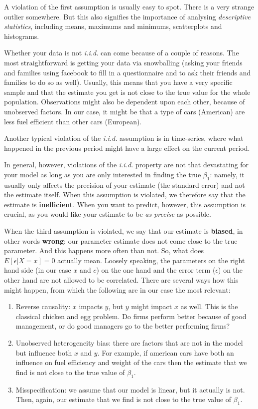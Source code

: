 \documentclass[]{article}
\theoremstyle{definition}
\theoremstyle{definition}
\theoremstyle{definition}
\theoremstyle{remark}
\begin{document}
A violation of the first assumption is usually easy to spot. There is a
very strange outlier somewhere. But this also signifies the importance
of analysing \emph{descriptive statistics}, including means, maximums
and minimums, scatterplots and histograms.

Whether your data is not \emph{i.i.d.} can come because of a couple of
reasons. The most straightforward is getting your data via snowballing
(asking your friends and families using facebook to fill in a
questionnaire and to ask their friends and families to do so as well).
Usually, this means that you have a very specific sample and that the
estimate you get is not close to the true value for the whole
population. Observations might also be dependent upon each other,
because of unobserved factors. In our case, it might be that a type of
cars (American) are less fuel efficient than other cars (European).

Another typical violation of the \emph{i.i.d.} assumption is in
time-series, where what happened in the previous period might have a
large effect on the current period.

In general, however, violations of the \emph{i.i.d.} property are not
that devastating for your model as long as you are only interested in
finding the true \(\beta_1\): namely, it usually only affects the
precision of your estimate (the standard error) and not the estimate
itself. When this assumption is violated, we therefore say that the
estimate is \textbf{inefficient}. When you want to predict, however,
this assumption is crucial, as you would like your estimate to be
\emph{as precise} as possible.

When the third assumption is violated, we say that our estimate is
\textbf{biased}, in other words \textbf{wrong}: our parameter estimate
does not come close to the true parameter. And this happens more often
than not. So, what does \(E[\epsilon|X=x] = 0\) actually mean. Loosely
speaking, the parameters on the right hand side (in our case \(x\) and
\(c\)) on the one hand and the error term (\(\epsilon\)) on the other
hand are not allowed to be correlated. There are several ways how this
might happen, from which the following are in our case the most
relevant:

\begin{enumerate}
\def\labelenumi{\arabic{enumi})}
\item
  Reverse causality: \(x\) impacts \(y\), but \(y\) might impact \(x\)
  as well. This is the classical chicken and egg problem. Do firms
  perform better because of good management, or do good managers go to
  the better performing firms?
\item
  Unobserved heterogeneity bias: there are factors that are not in the
  model but influence both \(x\) and \(y\). For example, if american
  cars have both an influence on fuel efficiency and weight of the cars
  then the estimate that we find is not close to the true value of
  \(\beta_1\).
\item
  Misspecification: we assume that our model is linear, but it actually
  is not. Then, again, our estimate that we find is not close to the
  true value of \(\beta_1\).
\end{enumerate}
\end{document}
